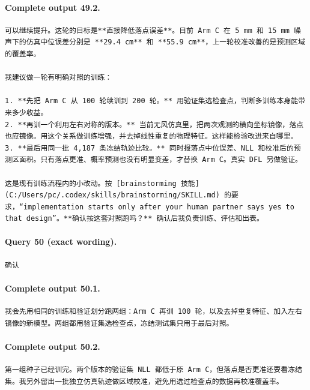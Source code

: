 \documentclass[UTF8,10pt]{ctexart}
\begin{document}
\paragraph{Complete output 49.2.}
\begin{Verbatim}[breaklines=true,breakanywhere=true,fontsize=\scriptsize,frame=single,framesep=2pt]
可以继续提升。这轮的目标是**直接降低落点误差**。目前 Arm C 在 5 mm 和 15 mm 噪声下的仿真中位误差分别是 **29.4 cm** 和 **55.9 cm**，上一轮校准改善的是预测区域的覆盖率。

我建议做一轮有明确对照的训练：

1. **先把 Arm C 从 100 轮续训到 200 轮。** 用验证集选检查点，判断多训练本身能带来多少收益。
2. **再训一个利用左右对称的版本。** 当前无风仿真里，把两次观测的横向坐标镜像，落点也应镜像。用这个关系做训练增强，并去掉线性重复的物理特征。这样能检验改进来自哪里。
3. **最后用同一批 4,187 条冻结轨迹比较。** 同时报落点中位误差、NLL 和校准后的预测区面积。只有落点更准、概率预测也没有明显变差，才替换 Arm C。真实 DFL 另做验证。

这是现有训练流程内的小改动。按 [brainstorming 技能](C:/Users/pc/.codex/skills/brainstorming/SKILL.md) 的要求，“implementation starts only after your human partner says yes to that design”。**确认按这套对照跑吗？** 确认后我负责训练、评估和出表。
\end{Verbatim}

\paragraph{Query 50 (exact wording).}
\begin{Verbatim}[breaklines=true,breakanywhere=true,fontsize=\scriptsize,frame=single,framesep=2pt]
确认
\end{Verbatim}

\paragraph{Complete output 50.1.}
\begin{Verbatim}[breaklines=true,breakanywhere=true,fontsize=\scriptsize,frame=single,framesep=2pt]
我会先用相同的训练和验证划分跑两组：Arm C 再训 100 轮，以及去掉重复特征、加入左右镜像的新模型。两组都用验证集选检查点，冻结测试集只用于最后对照。
\end{Verbatim}

\paragraph{Complete output 50.2.}
\begin{Verbatim}[breaklines=true,breakanywhere=true,fontsize=\scriptsize,frame=single,framesep=2pt]
第一组种子已经训完。两个版本的验证集 NLL 都低于原 Arm C，但落点是否更准还要看冻结集。我另外留出一批独立仿真轨迹做区域校准，避免用选过检查点的数据再校准覆盖率。
\end{Verbatim}
\end{document}
